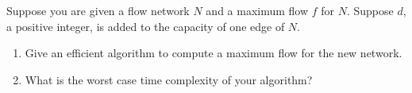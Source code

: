 Suppose you are given a flow network $N$ and a maximum flow $f$ for
$N$.  Suppose $d$, a positive integer, is added to the capacity of one
edge of $N$.

\begin{enumerate}

\item  Give an efficient algorithm to compute a maximum flow for the new
network.

\item  What is the worst case time complexity of your algorithm?

\end{enumerate}
